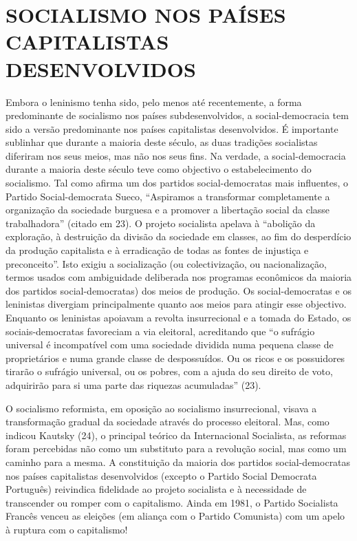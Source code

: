 \documentclass[twocolumn,amsmath,amssymb,aps,pre,floatfix]{revtex4-2}
\begin{document}
\section{SOCIALISMO NOS PAÍSES CAPITALISTAS DESENVOLVIDOS}

\par
Embora o leninismo tenha sido, pelo menos até recentemente, a forma predominante de socialismo nos países subdesenvolvidos, a social-democracia tem sido a versão predominante nos países capitalistas desenvolvidos. É importante sublinhar que durante a maioria deste século, as duas tradições socialistas diferiram nos seus meios, mas não nos seus fins. Na verdade, a social-democracia durante a maioria deste século teve como objectivo o estabelecimento do socialismo. Tal como afirma um dos partidos social-democratas mais influentes, o Partido Social-democrata Sueco, “Aspiramos a transformar completamente a organização da sociedade burguesa e a promover a libertação social da classe trabalhadora” (citado em 23). O projeto socialista apelava à “abolição da exploração, à destruição da divisão da sociedade em classes, ao fim do desperdício da produção capitalista e à erradicação de todas as fontes de injustiça e preconceito”. Isto exigiu a socialização (ou colectivização, ou nacionalização, termos usados ​​com ambiguidade deliberada nos programas econômicos da maioria dos partidos social-democratas) dos meios de produção. Os social-democratas e os leninistas divergiam principalmente quanto aos meios para atingir esse objectivo. Enquanto os leninistas apoiavam a revolta insurrecional e a tomada do Estado, os sociais-democratas favoreciam a via eleitoral, acreditando que “o sufrágio universal é incompatível com uma sociedade dividida numa pequena classe de proprietários e numa grande classe de despossuídos. Ou os ricos e os possuidores tirarão o sufrágio universal, ou os pobres, com a ajuda do seu direito de voto, adquirirão para si uma parte das riquezas acumuladas” (23).
\par
O socialismo reformista, em oposição ao socialismo insurrecional, visava a transformação gradual da sociedade através do processo eleitoral. Mas, como indicou Kautsky (24), o principal teórico da Internacional Socialista, as reformas foram percebidas não como um substituto para a revolução social, mas como um caminho para a mesma. A constituição da maioria dos partidos social-democratas nos países capitalistas desenvolvidos (excepto o Partido Social Democrata Português) reivindica fidelidade ao projeto socialista e à necessidade de transcender ou romper com o capitalismo. Ainda em 1981, o Partido Socialista Francês venceu as eleições (em aliança com o Partido Comunista) com um apelo à ruptura com o capitalismo!
\end{document}
